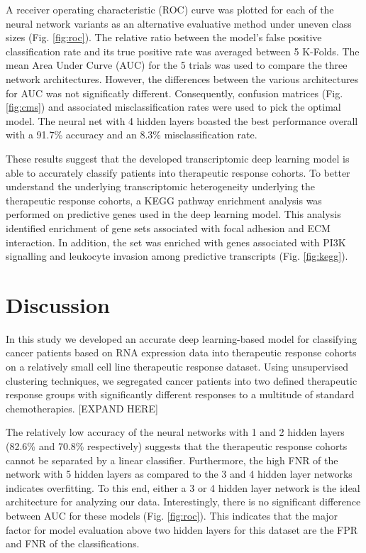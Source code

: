 \documentclass[10pt, letterpaper]{article}
\begin{document}
\begin{multicols}{2}
A receiver operating characteristic (ROC) curve was plotted for each of the neural network variants as an alternative evaluative method under uneven class sizes (Fig. \ref{fig:roc}). The relative ratio between the model’s false positive classification rate and its true positive rate was averaged between 5 K-Folds. The mean Area Under Curve (AUC) for the 5 trials was used to compare the three network architectures. However, the differences between the various architectures for AUC was not significatly different. Consequently, confusion matrices (Fig. \ref{fig:cms}) and associated misclassification rates were used to pick the optimal model. The neural net with 4 hidden layers boasted the best performance overall with a 91.7\% accuracy and an 8.3\% misclassification rate.

These results suggest that the developed transcriptomic deep learning model is able to accurately classify patients into therapeutic response cohorts. To better understand the underlying transcriptomic heterogeneity underlying the therapeutic response cohorts, a KEGG pathway enrichment analysis was performed on predictive genes used in the deep learning model. This analysis identified enrichment of gene sets associated with focal adhesion and ECM interaction. In addition, the set was enriched with genes associated with PI3K signalling and leukocyte invasion among predictive transcripts (Fig. \ref{fig:kegg}).


\section{Discussion}
In this study we developed an accurate deep learning-based model for classifying cancer patients based on RNA expression data into therapeutic response cohorts on a relatively small cell line therapeutic response dataset. Using unsupervised clustering techniques, we segregated cancer patients into two defined therapeutic response groups with significantly different responses to a multitude of standard chemotherapies. [EXPAND HERE]

The relatively low accuracy of the neural networks with 1 and 2 hidden layers (82.6\% and 70.8\% respectively) suggests that the therapeutic response cohorts cannot be separated by a linear classifier. Furthermore, the high FNR of the network with 5 hidden layers as compared to the 3 and 4 hidden layer networks indicates overfitting. To this end, either a 3 or 4 hidden layer network is the ideal architecture for analyzing our data. Interestingly, there is no significant difference between AUC for these models (Fig. \ref{fig:roc}). This indicates that the major factor for model evaluation above two hidden layers for this dataset are the FPR and FNR of the classifications.


\end{multicols}
\end{document}
